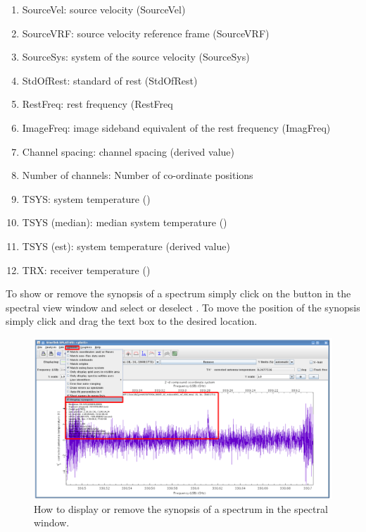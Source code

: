 \documentclass[11pt,oneside,chapters]{starlink}
\providecommand{\att}[1]{\textsf{#1}}
\begin{document}
\begin{enumerate}
\item  SourceVel: source velocity (\att{SourceVel})
\item  SourceVRF: source velocity reference frame (\att{SourceVRF})
\item  SourceSys: system of the source velocity (\att{SourceSys})
\item  StdOfRest: standard of rest (\att{StdOfRest})
\item  RestFreq: rest frequency (\att{RestFreq}
\item  ImageFreq: image sideband equivalent of the rest frequency (\att{ImagFreq})
\item  Channel spacing: channel spacing (derived value)
\item  Number of channels: Number of co-ordinate positions
\item  TSYS: system temperature ()
\item  TSYS (median): median system temperature ()
\item  TSYS (est): system temperature (derived value)
\item  TRX: receiver temperature ()
\end{enumerate}

To show or remove the synopsis of a spectrum simply click on the
 button in the spectral view window and select or deselect
. To move the position of the synopsis simply click
and drag the text box to the desired location.

\begin{figure}[h!]
\begin{center}
\includegraphics[width=0.8\linewidth]{sc20_splat_display_synopsis}
\caption[Display or remove the spectral synopsis.]{\label{fig:splat_synopsis}
  How to display or remove the synopsis of a spectrum in the spectral
  window.}
\end{center}
\end{figure}
\end{document}
